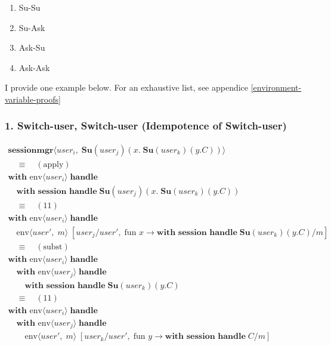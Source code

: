 \documentclass[logo,bsc,singlespacing,parskip]{infthesis}
\begin{document}
\begin{enumerate}
    \item Su-Su
    \item Su-Ask
    \item Ask-Su
    \item Ask-Ask
\end{enumerate}
    

I provide one example below. For an exhaustive list, see appendice \ref{environment-variable-proofs}
\subsubsection*{1. Switch-user, Switch-user (Idempotence of Switch-user)}


\[
\begin{array}{l}
\textbf{sessionmgr} \langle \mathit{user}_i,\; \textbf{Su}(\mathit{user}_j)(x.\;\textbf{Su}(\mathit{user}_k)(y.C)) \rangle \\[5pt]

\quad\equiv\quad (\text{apply}) \\[5pt]
\textbf{with }\text{}\text{env} \langle \mathit{user}_i \rangle\; \textbf{handle} \\
\quad\textbf{with session handle}\; \textbf{Su}(\mathit{user}_j)(x.\;\textbf{Su}(\mathit{user}_k)(y.C)) \\[5pt]

\quad\equiv\quad (11) \\[5pt]
\textbf{with }\text{env} \langle \mathit{user}_i \rangle\; \textbf{handle} \\
\quad\textbf{}\text{env} \langle \mathit{user}',\; m \rangle\; [\mathit{user}_j/\mathit{user}',\; \text{fun } x \rightarrow \textbf{with session handle}\; \textbf{Su}(\mathit{user}_k)(y.C)/m] \\[5pt]

\quad\equiv\quad (\text{subst}) \\[5pt]
\textbf{with }\text{env} \langle \mathit{user}_i \rangle\; \textbf{handle} \\
\quad\textbf{with }\text{env} \langle \mathit{user}_j \rangle\; \textbf{handle} \\
\qquad\textbf{with session handle}\; \textbf{Su}(\mathit{user}_k)(y.C) \\[5pt]

\quad\equiv\quad (11) \\[5pt]
\textbf{with }\text{env} \langle \mathit{user}_i \rangle\; \textbf{handle} \\
\quad\textbf{with }\text{env} \langle \mathit{user}_j \rangle\; \textbf{handle} \\
\qquad\textbf{}\text{env} \langle \mathit{user}',\; m \rangle\; [\mathit{user}_k/\mathit{user}',\; \text{fun } y \rightarrow \textbf{with session handle}\; C/m] \\[5pt]


\end{array}\]
\end{document}
